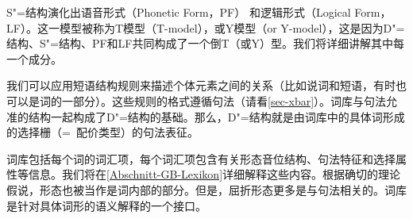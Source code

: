S"=结构演化出语音形式（Phonetic Form，PF） 和逻辑形式（Logical Form，LF）。这一模型被称为T模型（T-model），或Y模型（or Y-model），这是因为D"=结构、S"=结构、PF和LF共同构成了一个倒T（或Y）型。我们将详细讲解其中每一个成分。

我们可以应用短语结构规则来描述个体元素之间的关系（比如说词和短语，有时也可以是词的一部分）。这些规则的格式遵循\xbarc 句法（请看\ref{sec-xbar}）。词库与\xbarc 句法允准的结构一起构成了D"=结构的基础。那么，D"=结构就是由词库中的具体词形成的选择栅（=~配价类型）的句法表征。

词库包括每个词的词汇项，每个词汇项包含有关形态音位结构、句法特征和选择属性等信息。我们将在\ref{Abschnitt-GB-Lexikon}详细解释这些内容。根据确切的理论假说，形态也被当作是词内部的部分。但是，屈折形态更多是与句法相关的。词库是针对具体词形的语义解释的一个接口。

